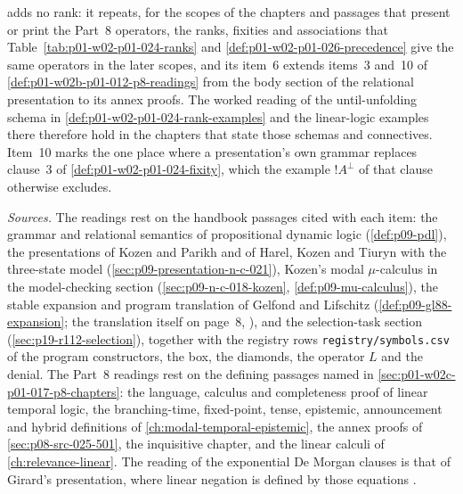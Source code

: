  adds no rank: it repeats, for
the scopes of the chapters and passages that present or print the
Part~8 operators, the ranks, fixities and associations that
Table~\ref{tab:p01-w02-p01-024-ranks} and
\cref{def:p01-w02-p01-026-precedence} give the same operators in the
later scopes, and its item~6 extends items~3 and~10 of
\cref{def:p01-w02b-p01-012-p8-readings} from the body section of the
relational presentation to its annex proofs.  The worked reading of the
until-unfolding schema in \cref{def:p01-w02-p01-024-rank-examples} and
the linear-logic examples there therefore hold in the chapters that
state those schemas and connectives.  Item~10 marks the one place where a
presentation's own grammar replaces clause~3 of
\cref{def:p01-w02-p01-024-fixity}, which the example
\(!A^\perp\) of that clause otherwise excludes.

\emph{Sources.}  The readings rest on the handbook passages cited with
each item: the grammar and relational semantics of propositional dynamic
logic (\cref{def:p09-pdl}), the presentations of Kozen and Parikh and of
Harel, Kozen and Tiuryn with the three-state model
(\cref{sec:p09-presentation-n-c-021}), Kozen's modal \(\mu\)-calculus
in the model-checking section (\cref{sec:p09-n-c-018-kozen},
\cref{def:p09-mu-calculus}), the stable expansion and program
translation of Gelfond and Lifschitz (\cref{def:p09-gl88-expansion}; the
translation itself on page~8,
\cite[p.~8]{GelfondLifschitz1988}), and
the selection-task section (\cref{sec:p19-r112-selection}), together with
the registry rows \texttt{registry/symbols.csv} of the program
constructors, the box, the diamonds, the operator \(L\) and the denial.
The Part~8 readings rest on the defining passages named in
\cref{sec:p01-w02c-p01-017-p8-chapters}: the language, calculus and
completeness proof of linear temporal logic, the branching-time, fixed-point,
tense, epistemic, announcement and hybrid definitions of
\cref{ch:modal-temporal-epistemic}, the annex proofs of
\cref{sec:p08-src-025-501}, the inquisitive chapter, and the linear
calculi of \cref{ch:relevance-linear}.  The reading of the exponential
De Morgan clauses is that of Girard's presentation, where linear
negation is defined by those equations
\cite[\S1.2.2, p.~10]{Girard1995}.
